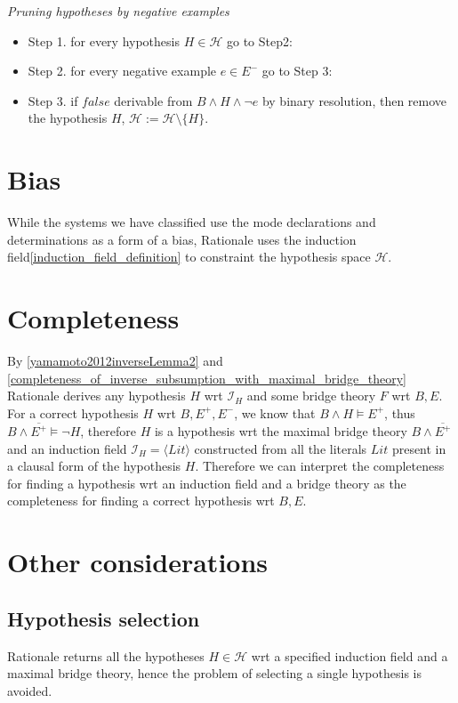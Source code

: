 \begin{algorithm}\emph{Pruning hypotheses by negative examples}
\begin{itemize}
\item Step 1. for every hypothesis $H \in \mathcal{H}$ go to Step2:
\item Step 2. for every negative example $e \in E^-$ go to Step 3:
\item Step 3. if $false$ derivable from $B \land H \land \neg e$ by binary resolution, then remove the hypothesis $H$, $\mathcal{H}:=\mathcal{H} \setminus \{H\}$.
\end{itemize}
\end{algorithm}

\section{Bias}
While the systems we have classified use the mode declarations and determinations as a form of a bias, Rationale uses the induction field\ref{induction_field_definition} to constraint the hypothesis space $\mathcal{H}$.

\section{Completeness}
By \ref{yamamoto2012inverseLemma2} and \ref{completeness_of_inverse_subsumption_with_maximal_bridge_theory} Rationale derives any hypothesis $H$ wrt $\mathcal{I}_H$ and some bridge theory $F$ wrt $B, E$. For a correct hypothesis $H$ wrt $B, E^+, E^-$, we know that $B \land H \models E^+$, thus $B \land \overline{E^+} \models \neg H$, therefore $H$ is a hypothesis wrt the maximal bridge theory $B \land \overline{E^+}$ and an induction field $\mathcal{I}_H=\langle Lit \rangle$ constructed from all the literals $Lit$ present in a clausal form of the hypothesis $H$. Therefore we can interpret the completeness for finding a hypothesis wrt an induction field and a bridge theory as the completeness for finding a correct hypothesis wrt $B, E$.

\section{Other considerations}
\subsection{Hypothesis selection}
Rationale returns all the hypotheses $H \in \mathcal{H}$ wrt a specified induction field and a maximal bridge theory, hence the problem of selecting a single hypothesis is avoided.

